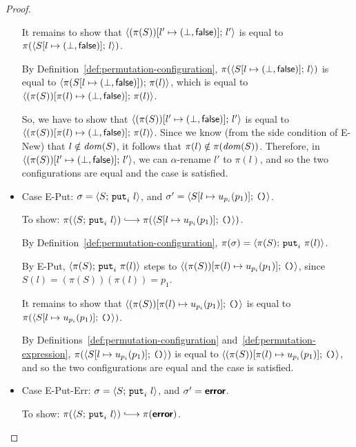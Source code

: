 \begin{proof}
\begin{itemize}
      It remains to show that
      $\langle (\pi(S))[l' \mapsto (\bot, \textsf{false})];\, l' \rangle$ is equal
      to $\pi(\langle S[l \mapsto (\bot, \textsf{false})];\, l \rangle)$.

      By Definition~\ref{def:permutation-configuration},
      $\pi(\langle S[l \mapsto (\bot, \textsf{false})];\, l \rangle)$ is equal to
      $\langle \pi(S[l \mapsto (\bot, \textsf{false})]);\, \pi(l) \rangle$, which
      is equal to
      $\langle (\pi(S))[\pi(l) \mapsto (\bot, \textsf{false})];\, \pi(l) \rangle$.

      So, we have to show that
      $\langle (\pi(S))[l' \mapsto (\bot, \textsf{false})];\, l' \rangle$ is equal
      to
      $\langle (\pi(S))[\pi(l) \mapsto (\bot, \textsf{false})];\, \pi(l) \rangle$.
      Since we know (from the side condition of {\sc E-New}) that $l
      \notin \mathit{dom}(S)$, it follows that $\pi(l) \notin \pi(\mathit{dom}(S))$.
      Therefore, in
      $\langle (\pi(S))[l' \mapsto (\bot, \textsf{false})];\, l' \rangle$, we can
      $\alpha$-rename $l'$ to $\pi(l)$, and so the two configurations
      are equal and the case is satisfied.

    \item Case {\sc E-Put}: $\sigma = \langle S;\, \mbox{\texttt{put}}_i~l \rangle$, and
      $\sigma' = \langle S[l \mapsto u_{p_i}(p_1)];\, \mbox{\texttt{()}} \rangle$.

      To show: $\pi(\config{S}{\putiexp{l}}) \parstepsto
      \pi(\config{\extSRaw{S}{l}{u_{p_i}(p_1)}}{\unit})$.

      By Definition~\ref{def:permutation-configuration}, $\pi(\sigma) =
      \langle \pi(S);\, \mbox{\texttt{put}}_i~\pi(l) \rangle$.

      By {\sc E-Put}, $\langle \pi(S);\, \mbox{\texttt{put}}_i~\pi(l) \rangle$ steps to
      $\langle (\pi(S))[\pi(l) \mapsto u_{p_i}(p_1)];\, \mbox{\texttt{()}} \rangle$,
      since $S(l) = (\pi(S))(\pi(l)) = p_1$.

      It remains to show that
      $\langle (\pi(S))[\pi(l) \mapsto u_{p_i}(p_1)];\, \mbox{\texttt{()}} \rangle$ is
      equal to $\pi(\langle S[l \mapsto u_{p_i}(p_1)];\, \mbox{\texttt{()}} \rangle)$.

      By Definitions~\ref{def:permutation-configuration}
      and~\ref{def:permutation-expression},
      $\pi(\langle S[l \mapsto u_{p_i}(p_1)];\, \mbox{\texttt{()}} \rangle)$ is equal to
      $\langle (\pi(S))[\pi(l) \mapsto u_{p_i}(p_1)];\, \mbox{\texttt{()}} \rangle$, and
      so the two configurations are equal and the case is satisfied.
    \item Case {\sc E-Put-Err}: $\sigma = \langle S;\, \mbox{\texttt{put}}_i~l \rangle$,
      and $\sigma' = \textbf{\textsf{error}}$.

      To show: $\pi(\config{S}{\putiexp{l}}) \parstepsto
      \pi(\error)$.


\end{itemize}
\end{proof}
